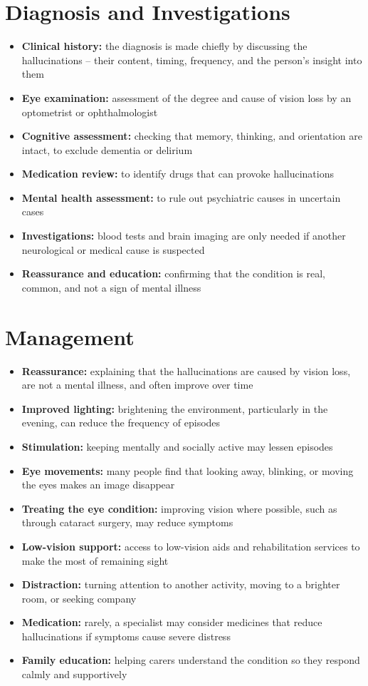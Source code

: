 \section*{Diagnosis and Investigations}
\begin{itemize}
    \item \textbf{Clinical history:} the diagnosis is made chiefly by discussing the hallucinations -- their content, timing, frequency, and the person's insight into them
    \item \textbf{Eye examination:} assessment of the degree and cause of vision loss by an optometrist or ophthalmologist
    \item \textbf{Cognitive assessment:} checking that memory, thinking, and orientation are intact, to exclude dementia or delirium
    \item \textbf{Medication review:} to identify drugs that can provoke hallucinations
    \item \textbf{Mental health assessment:} to rule out psychiatric causes in uncertain cases
    \item \textbf{Investigations:} blood tests and brain imaging are only needed if another neurological or medical cause is suspected
    \item \textbf{Reassurance and education:} confirming that the condition is real, common, and not a sign of mental illness
\end{itemize}

\section*{Management}
\begin{itemize}
    \item \textbf{Reassurance:} explaining that the hallucinations are caused by vision loss, are not a mental illness, and often improve over time
    \item \textbf{Improved lighting:} brightening the environment, particularly in the evening, can reduce the frequency of episodes
    \item \textbf{Stimulation:} keeping mentally and socially active may lessen episodes
    \item \textbf{Eye movements:} many people find that looking away, blinking, or moving the eyes makes an image disappear
    \item \textbf{Treating the eye condition:} improving vision where possible, such as through cataract surgery, may reduce symptoms
    \item \textbf{Low-vision support:} access to low-vision aids and rehabilitation services to make the most of remaining sight
    \item \textbf{Distraction:} turning attention to another activity, moving to a brighter room, or seeking company
    \item \textbf{Medication:} rarely, a specialist may consider medicines that reduce hallucinations if symptoms cause severe distress
    \item \textbf{Family education:} helping carers understand the condition so they respond calmly and supportively
\end{itemize}

